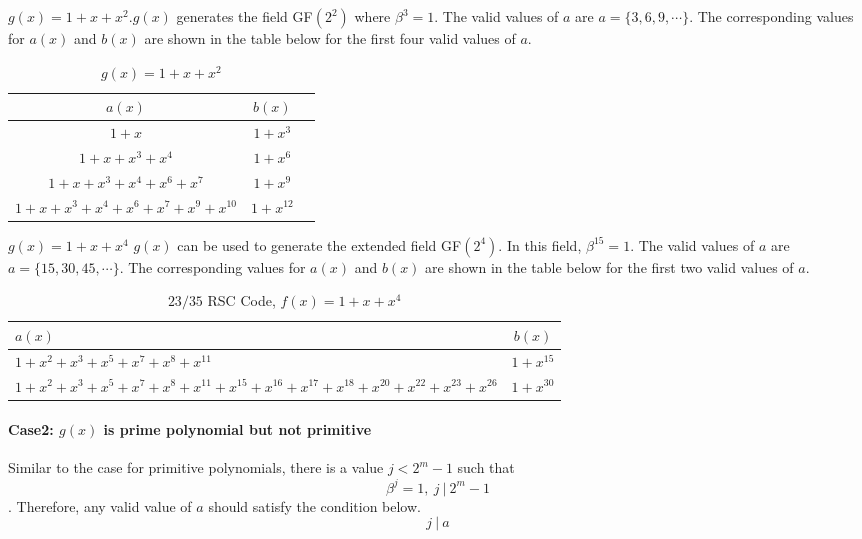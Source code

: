 \begin{example}
$g(x)=1+x+x^2$.\newline $g(x)$ generates the field GF$(2^2)$ where $\beta^{3}=1$. The valid values of $a$ are $a=\{3,6,9,\cdots \}$. The corresponding values for $a(x)$ and $b(x)$ are shown in the table below for the first four valid values of $a$.

 \begin{table*}[h]
 \caption{$g(x)=1+x+x^2$}
\centering
 \begin{tabular}{c c c} 
 \hline
 $a(x)$ & $b(x)$ \\ [0.5ex] 
 \hline\hline
$1+x$
 & $1+x^{3}$ \\
\hline
$1+x+x^3+x^4$
 & $1+x^{6}$ 
 \\
\hline
$1+x+x^3+x^4+x^6+x^{7}$ 
&  $1+x^{9}$ 
\\
\hline
$1+x+x^3+x^4+x^6+x^{7}+x^9+x^{10}$
 &  $1+x^{12}$ \\
 \end{tabular}
 \label{novelTab2}
\end{table*}
\end{example}

\begin{example}$g(x)=1+x+x^4$\newline
$g(x)$ can be used to generate the extended field GF$(2^4)$. In this field, $\beta^{15}=1$. The valid values of $a$ are $a=\{15,30,45,\cdots \}$. The corresponding values for $a(x)$ and $b(x)$ are shown in the table below for the first two valid values of $a$.

 \begin{table*}[h]
 \caption{$23/35$ RSC Code, $f(x)=1+x+x^4$}
\centering
\begin{tabular}{p{4cm} | c} 
 \hline
 $a(x)$ & $b(x)$  \\ [0.5ex] 
 \hline\hline
$1+x^2+x^3+x^5+x^7+x^8+x^{11}$ 
& $1+x^{15}$ \\ 
\hline
$1+x^2+x^3+x^5+x^7+x^8+x^{11}+x^{15}+x^{16}+x^{17}+x^{18}+x^{20}+x^{22}+x^{23}+x^{26}$ 
&$1+x^{30}$\\
 \end{tabular}
 \label{novelTab5}
\end{table*}

\end{example}
\paragraph{ Case2: $g(x)$ is prime polynomial but not primitive \newline}
Similar to the case for primitive polynomials, there is a value $j < 2^m-1$ such that 
$$\beta^j=1,~j~|~2^{m}-1 $$. Therefore, any valid value of $a$ should satisfy the condition below.
$$j~|~a$$

